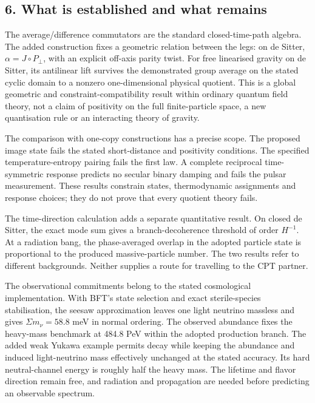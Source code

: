 \documentclass[
]{article}
\begin{document}
\subsection{6. What is established and what
remains}\label{what-is-established-and-what-remains}

The average/difference commutators are the standard closed-time-path
algebra. The added construction fixes a geometric relation between the
legs: on de Sitter, \(\alpha=J\circ P_\perp\), with an explicit off-axis
parity twist. For free linearised gravity on de Sitter, its antilinear
lift survives the demonstrated group average on the stated cyclic domain
to a nonzero one-dimensional physical quotient. This is a global
geometric and constraint-compatibility result within ordinary quantum
field theory, not a claim of positivity on the full finite-particle
space, a new quantisation rule or an interacting theory of gravity.

The comparison with one-copy constructions has a precise scope. The
proposed image state fails the stated short-distance and positivity
conditions. The specified temperature-entropy pairing fails the first
law. A complete reciprocal time-symmetric response predicts no secular
binary damping and fails the pulsar measurement. These results constrain
states, thermodynamic assignments and response choices; they do not
prove that every quotient theory fails.

The time-direction calculation adds a separate quantitative result. On
closed de Sitter, the exact mode sum gives a branch-decoherence
threshold of order \(H^{-1}\). At a radiation bang, the phase-averaged
overlap in the adopted particle state is proportional to the produced
massive-particle number. The two results refer to different backgrounds.
Neither supplies a route for travelling to the CPT partner.

The observational commitments belong to the stated cosmological
implementation. With BFT's state selection and exact sterile-species
stabilisation, the seesaw approximation leaves one light neutrino
massless and gives \(\Sigma m_\nu=58.8\) meV in normal ordering. The
observed abundance fixes the heavy-mass benchmark at 484.8 PeV within
the adopted production branch. The added weak Yukawa example permits
decay while keeping the abundance and induced light-neutrino mass
effectively unchanged at the stated accuracy. Its hard neutral-channel
energy is roughly half the heavy mass. The lifetime and flavor direction
remain free, and radiation and propagation are needed before predicting
an observable spectrum.
\end{document}
